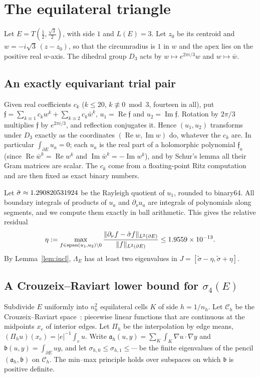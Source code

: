 \documentclass[11pt]{article}
\theoremstyle{definition}
\theoremstyle{remark}
\newcommand{\Lam}{\Lambda}
\renewcommand{\Re}{\operatorname{Re}}
\renewcommand{\Im}{\operatorname{Im}}
\begin{document}
\section{The equilateral triangle}\label{sec:eq}

Let $E=T(\frac12,\frac{\sqrt3}2)$, with side $1$ and $L(E)=3$. Let $z_0$ be its centroid and
$w=-i\sqrt3\,(z-z_0)$, so that the circumradius is $1$ in $w$ and the apex lies on the positive real $w$-axis. The dihedral group $D_3$
acts by $w\mapsto e^{2\pi i/3}w$ and $w\mapsto\bar w$.

\subsection{An exactly equivariant trial pair}
Given real coefficients $c_k$ ($k\le20$, $k\not\equiv0\bmod3$, fourteen in all), put
$\mathfrak f=\sum_{k\equiv1}c_kw^k+\sum_{k\equiv2}c_k\bar w^k$, $u_1=\Re\mathfrak f$ and $u_2=\Im\mathfrak f$. Rotation by
$2\pi/3$ multiplies $\mathfrak f$ by $e^{2\pi i/3}$, and reflection conjugates it. Hence $(u_1,u_2)$ transforms
under $D_3$ exactly as the coordinates $(\Re w,\Im w)$ do, whatever the $c_k$ are. In particular
$\int_{\partial E}u_a=0$; each $u_a$ is the real part of a holomorphic polynomial $\mathfrak f_a$ (since
$\Re\bar w^k=\Re w^k$ and $\Im\bar w^k=-\Im w^k$), and by Schur's lemma all their Gram
matrices are scalar. The $c_k$ come from a floating-point Ritz computation and are then fixed as exact
binary numbers.

Let $\tilde\sigma\approx1.290820531924$ be the Rayleigh quotient of $u_1$, rounded to binary64. All
boundary integrals of products of $u_a$ and $\partial_\nu u_a$ are integrals of polynomials along segments,
and we compute them exactly in ball arithmetic. This gives the relative residual
\[\eta:=\max_{f\in\operatorname{span}(u_1,u_2)\setminus0}\frac{\|\partial_\nu f-\tilde\sigma f\|_{L^2(\partial E)}}{\|f\|_{L^2(\partial E)}}\le1.9559\times10^{-13}.\]
By Lemma~\ref{lem:incl}, $\Lam_E$ has at least two eigenvalues in $J=[\tilde\sigma-\eta,\tilde\sigma+\eta]$.

\subsection{\texorpdfstring{A Crouzeix--Raviart lower bound for $\sigma_4(E)$}{A Crouzeix-Raviart lower bound for sigma4(E)}}
Subdivide $E$ uniformly into $n_h^2$ equilateral cells $K$ of side $h=1/n_h$. Let $\mathcal C_h$ be the
Crouzeix--Raviart space~\cite{CR}: piecewise linear functions that are continuous at the midpoints $x_e$ of
interior edges. Let $\Pi_h$ be the interpolation by edge means, $(\Pi_hu)(x_e)=|e|^{-1}\int_eu$. Write
$\mathfrak a_h(u,y)=\sum_K\int_K\nabla u\cdot\nabla y$ and $\mathfrak b(u,y)=\int_{\partial E}uy$, and let
$\sigma_{h,0}\le\sigma_{h,1}\le\cdots$ be the finite eigenvalues of the pencil $(\mathfrak a_h,\mathfrak b)$
on $\mathcal C_h$. The min--max principle holds over subspaces on which $\mathfrak b$ is positive definite.
\end{document}
